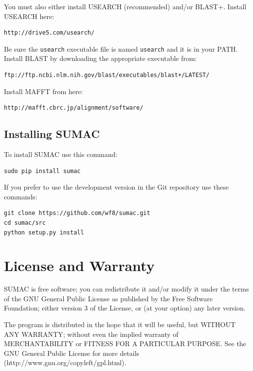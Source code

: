 \documentclass[10pt]{report}
\begin{document}
You must also either install USEARCH (recommended) and/or BLAST+.
Install USEARCH here:

\begin{verbatim}
http://drive5.com/usearch/
\end{verbatim}
Be sure the \texttt{usearch} executable file is named
\texttt{usearch} and it is in your PATH.
Install BLAST by downloading the appropriate executable from:

\begin{verbatim}
ftp://ftp.ncbi.nlm.nih.gov/blast/executables/blast+/LATEST/
\end{verbatim}

Install MAFFT from here:

\begin{verbatim}
http://mafft.cbrc.jp/alignment/software/
\end{verbatim}


\subsection{Installing SUMAC}

To install SUMAC use this command:

\begin{verbatim}
sudo pip install sumac
\end{verbatim}

If you prefer to use the development version in the Git repository
use these commands:

\begin{verbatim}
git clone https://github.com/wf8/sumac.git
cd sumac/src
python setup.py install
\end{verbatim}

\section{License and Warranty}

SUMAC is free software; you can redistribute it and/or modify it under the terms of the GNU General Public License as published by the Free Software Foundation; either version 3 of the License, or (at your option) any later version.

The program is distributed in the hope that it will be useful, but WITHOUT ANY WARRANTY; without even the implied warranty of MERCHANTABILITY or FITNESS FOR A PARTICULAR PURPOSE. See the GNU General Public License for more details \\ (http://www.gnu.org/copyleft/gpl.html).
\end{document}
